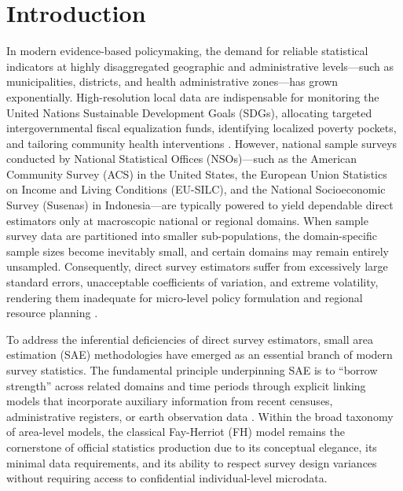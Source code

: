 
\section{Introduction} \label{sec:intro}

In modern evidence-based policymaking, the demand for reliable statistical indicators at highly disaggregated geographic and administrative levels---such as municipalities, districts, and health administrative zones---has grown exponentially. High-resolution local data are indispensable for monitoring the United Nations Sustainable Development Goals (SDGs), allocating targeted intergovernmental fiscal equalization funds, identifying localized poverty pockets, and tailoring community health interventions \citep{rao2015small, pfeffermann2013new}. However, national sample surveys conducted by National Statistical Offices (NSOs)---such as the American Community Survey (ACS) in the United States, the European Union Statistics on Income and Living Conditions (EU-SILC), and the National Socioeconomic Survey (Susenas) in Indonesia---are typically powered to yield dependable direct estimators only at macroscopic national or regional domains. When sample survey data are partitioned into smaller sub-populations, the domain-specific sample sizes become inevitably small, and certain domains may remain entirely unsampled. Consequently, direct survey estimators suffer from excessively large standard errors, unacceptable coefficients of variation, and extreme volatility, rendering them inadequate for micro-level policy formulation and regional resource planning \citep{burgard2020computational, pratesi2016analysis}.

To address the inferential deficiencies of direct survey estimators, small area estimation (SAE) methodologies have emerged as an essential branch of modern survey statistics. The fundamental principle underpinning SAE is to ``borrow strength'' across related domains and time periods through explicit linking models that incorporate auxiliary information from recent censuses, administrative registers, or earth observation data \citep{rao2015small}. Within the broad taxonomy of area-level models, the classical Fay-Herriot (FH) model \citep{fay1979estimates} remains the cornerstone of official statistics production due to its conceptual elegance, its minimal data requirements, and its ability to respect survey design variances without requiring access to confidential individual-level microdata.

